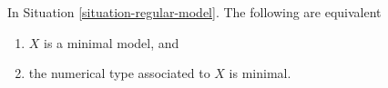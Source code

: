 \begin{lemma}
\label{lemma-numerical-type-minimal-model}
In Situation \ref{situation-regular-model}. The following
are equivalent
\begin{enumerate}
\item $X$ is a minimal model, and
\item the numerical type associated to $X$ is minimal.
\end{enumerate}
\end{lemma}